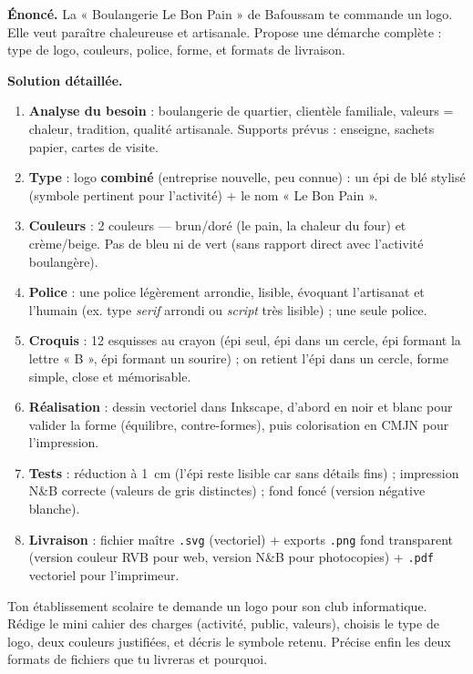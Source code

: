 \documentclass[11pt]{article}
\begin{document}
\begin{exoresolu}
\textbf{Énoncé.} La « Boulangerie Le Bon Pain » de Bafoussam te commande un logo. Elle veut paraître chaleureuse et artisanale. Propose une démarche complète : type de logo, couleurs, police, forme, et formats de livraison.

\tcblower
\textbf{Solution détaillée.}
\begin{enumerate}
  \item \textbf{Analyse du besoin} : boulangerie de quartier, clientèle familiale, valeurs = chaleur, tradition, qualité artisanale. Supports prévus : enseigne, sachets papier, cartes de visite.
  \item \textbf{Type} : logo \textbf{combiné} (entreprise nouvelle, peu connue) : un épi de blé stylisé (symbole pertinent pour l'activité) + le nom « Le Bon Pain ».
  \item \textbf{Couleurs} : 2 couleurs — brun/doré (le pain, la chaleur du four) et crème/beige. Pas de bleu ni de vert (sans rapport direct avec l'activité boulangère).
  \item \textbf{Police} : une police légèrement arrondie, lisible, évoquant l'artisanat et l'humain (ex. type \emph{serif} arrondi ou \emph{script} très lisible) ; une seule police.
  \item \textbf{Croquis} : 12 esquisses au crayon (épi seul, épi dans un cercle, épi formant la lettre « B », épi formant un sourire) ; on retient l'épi dans un cercle, forme simple, close et mémorisable.
  \item \textbf{Réalisation} : dessin vectoriel dans Inkscape, d'abord en noir et blanc pour valider la forme (équilibre, contre-formes), puis colorisation en CMJN pour l'impression.
  \item \textbf{Tests} : réduction à 1~cm (l'épi reste lisible car sans détails fins) ; impression N\&B correcte (valeurs de gris distinctes) ; fond foncé (version négative blanche).
  \item \textbf{Livraison} : fichier maître \texttt{.svg} (vectoriel) + exports \texttt{.png} fond transparent (version couleur RVB pour web, version N\&B pour photocopies) + \texttt{.pdf} vectoriel pour l'imprimeur.
\end{enumerate}
\end{exoresolu}

\begin{exercice}
Ton établissement scolaire te demande un logo pour son club informatique. Rédige le mini cahier des charges (activité, public, valeurs), choisis le type de logo, deux couleurs justifiées, et décris le symbole retenu. Précise enfin les deux formats de fichiers que tu livreras et pourquoi.
\end{exercice}
\end{document}
